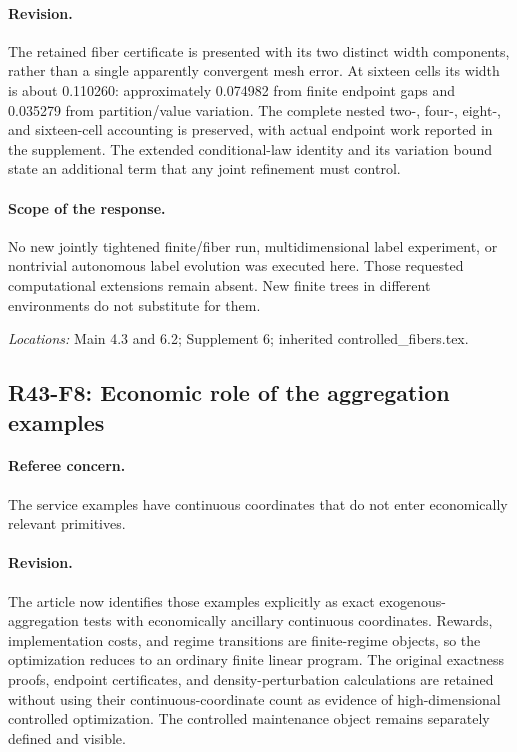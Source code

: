 \paragraph*{Revision.} The retained fiber certificate is presented with its two distinct width components, rather than a single apparently convergent mesh error. At sixteen cells its width is about 0.110260: approximately 0.074982 from finite endpoint gaps and 0.035279 from partition/value variation. The complete nested two-, four-, eight-, and sixteen-cell accounting is preserved, with actual endpoint work reported in the supplement. The extended conditional-law identity and its variation bound state an additional term that any joint refinement must control.

\paragraph*{Scope of the response.} No new jointly tightened finite/fiber run, multidimensional label experiment, or nontrivial autonomous label evolution was executed here. Those requested computational extensions remain absent. New finite trees in different environments do not substitute for them.

\noindent\textit{Locations:} Main 4.3 and 6.2; Supplement 6; inherited controlled\_fibers.tex.

\subsection{R43-F8: Economic role of the aggregation examples}
\paragraph*{Referee concern.} The service examples have continuous coordinates that do not enter economically relevant primitives.

\paragraph*{Revision.} The article now identifies those examples explicitly as exact exogenous-aggregation tests with economically ancillary continuous coordinates. Rewards, implementation costs, and regime transitions are finite-regime objects, so the optimization reduces to an ordinary finite linear program. The original exactness proofs, endpoint certificates, and density-perturbation calculations are retained without using their continuous-coordinate count as evidence of high-dimensional controlled optimization. The controlled maintenance object remains separately defined and visible.

